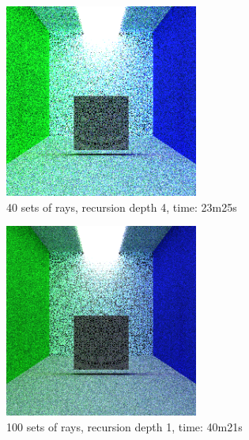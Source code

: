 \documentclass[journal]{IEEEtran}
\begin{document}
\begin{figure}[!t]

\centering
\includegraphics[width=2.5in]{40s_4d_23m25s}
\caption{40 sets of rays, recursion depth 4, time: 23m25s}
\label{40s_4d_23m25s}

\end{figure}

\begin{figure}[!t]

\centering
\includegraphics[width=2.5in]{100s_1d_40m21s}
\caption{100 sets of rays, recursion depth 1, time: 40m21s}
\label{100s_1d_40m21s}

\end{figure}
\end{document}
